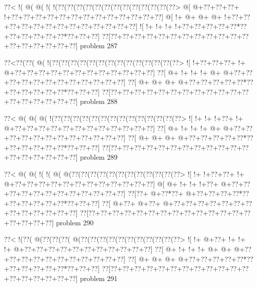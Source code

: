 \vbox{\vbox{\goo
\0??<\- !(\- @(\- @(\- !(\- !(\0??(\0??(\0??(\0??(\0??(\0??(\0??(\0??(\0??(\0??(\0??(\0??(\0??>
\- @[\- @+\0??+\0??+\0??+\- !+\0??+\0??+\0??+\0??+\0??+\0??+\0??+\0??+\0??+\0??+\0??+\0??+\0??]
\- @[\- !+\- @+\- @+\- @+\- !+\0??+\0??+\0??+\0??+\0??+\0??+\0??+\0??+\0??+\0??+\0??+\0??+\0??]
\- ![\- !+\- !+\- !+\- !+\0??+\0??+\0??+\0??+\0??*\0??+\0??+\0??+\0??+\0??+\0??*\0??+\0??+\0??]
\0??[\0??+\0??+\0??+\0??+\0??+\0??+\0??+\0??+\0??+\0??+\0??+\0??+\0??+\0??+\0??+\0??+\0??+\0??]
}
\hfil problem 287\hfil\break
}



\vbox{\vbox{\goo
\0??<\0??(\0??(\- @(\- !(\0??(\0??(\0??(\0??(\0??(\0??(\0??(\0??(\0??(\0??(\0??(\0??(\0??(\0??>
\- ![\- !+\0??+\0??+\0??+\- !+\- @+\0??+\0??+\0??+\0??+\0??+\0??+\0??+\0??+\0??+\0??+\0??+\0??]
\0??[\- @+\- !+\- !+\- !+\- @+\- @+\0??+\0??+\0??+\0??+\0??+\0??+\0??+\0??+\0??+\0??+\0??+\0??]
\0??[\- @+\- @+\- @+\- @+\0??+\0??+\0??+\0??+\0??*\0??+\0??+\0??+\0??+\0??+\0??*\0??+\0??+\0??]
\0??[\0??+\0??+\0??+\0??+\0??+\0??+\0??+\0??+\0??+\0??+\0??+\0??+\0??+\0??+\0??+\0??+\0??+\0??]
}
\hfil problem 288\hfil\break
}



\vbox{\vbox{\goo
\0??<\- @(\- @(\- @(\- !(\0??(\0??(\0??(\0??(\0??(\0??(\0??(\0??(\0??(\0??(\0??(\0??(\0??(\0??>
\- ![\- !+\- !+\- !+\0??+\- !+\- @+\0??+\0??+\0??+\0??+\0??+\0??+\0??+\0??+\0??+\0??+\0??+\0??]
\0??[\- @+\- !+\- !+\- !+\- @+\- @+\0??+\0??+\0??+\0??+\0??+\0??+\0??+\0??+\0??+\0??+\0??+\0??]
\0??[\- @+\- @+\- @+\- @+\0??+\0??+\0??+\0??+\0??*\0??+\0??+\0??+\0??+\0??+\0??*\0??+\0??+\0??]
\0??[\0??+\0??+\0??+\0??+\0??+\0??+\0??+\0??+\0??+\0??+\0??+\0??+\0??+\0??+\0??+\0??+\0??+\0??]
}
\hfil problem 289\hfil\break
}



\vbox{\vbox{\goo
\0??<\- @(\- @(\- !(\- !(\- @(\- @(\0??(\0??(\0??(\0??(\0??(\0??(\0??(\0??(\0??(\0??(\0??(\0??>
\- ![\- !+\- !+\0??+\0??+\- !+\- @+\0??+\0??+\0??+\0??+\0??+\0??+\0??+\0??+\0??+\0??+\0??+\0??]
\- @[\- @+\- !+\- !+\- !+\0??+\- @+\0??+\0??+\0??+\0??+\0??+\0??+\0??+\0??+\0??+\0??+\0??+\0??]
\0??[\0??+\- @+\0??*\0??+\- @+\0??+\0??+\0??+\0??*\0??+\0??+\0??+\0??+\0??+\0??*\0??+\0??+\0??]
\0??[\- @+\0??+\- @+\0??+\- @+\0??+\0??+\0??+\0??+\0??+\0??+\0??+\0??+\0??+\0??+\0??+\0??+\0??]
\0??[\0??+\0??+\0??+\0??+\0??+\0??+\0??+\0??+\0??+\0??+\0??+\0??+\0??+\0??+\0??+\0??+\0??+\0??]
}
\hfil problem 290\hfil\break
}



\vbox{\vbox{\goo
\0??<\- !(\0??(\- @(\0??(\0??(\0??(\- @(\0??(\0??(\0??(\0??(\0??(\0??(\0??(\0??(\0??(\0??(\0??>
\- ![\- !+\- @+\0??+\- !+\- !+\- !+\- @+\0??+\0??+\0??+\0??+\0??+\0??+\0??+\0??+\0??+\0??+\0??]
\0??[\- @+\- !+\- !+\- !+\- @+\- @+\- @+\0??+\0??+\0??+\0??+\0??+\0??+\0??+\0??+\0??+\0??+\0??]
\0??[\- @+\- @+\- @+\- @+\0??+\0??+\0??+\0??+\0??*\0??+\0??+\0??+\0??+\0??+\0??*\0??+\0??+\0??]
\0??[\0??+\0??+\0??+\0??+\0??+\0??+\0??+\0??+\0??+\0??+\0??+\0??+\0??+\0??+\0??+\0??+\0??+\0??]
}
\hfil problem 291\hfil\break
}



